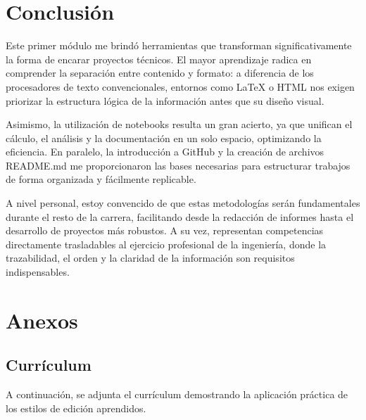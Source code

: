 \documentclass[runningheads]{llncs}
\begin{document}
\section{Conclusión}

Este primer módulo me brindó herramientas que transforman significativamente la forma de encarar proyectos técnicos. El mayor aprendizaje radica en comprender la separación entre contenido y formato: a diferencia de los procesadores de texto convencionales, entornos como LaTeX o HTML nos exigen priorizar la estructura lógica de la información antes que su diseño visual.

Asimismo, la utilización de notebooks resulta un gran acierto, ya que unifican el cálculo, el análisis y la documentación en un solo espacio, optimizando la eficiencia. En paralelo, la introducción a GitHub y la creación de archivos README.md me proporcionaron las bases necesarias para estructurar trabajos de forma organizada y fácilmente replicable.

A nivel personal, estoy convencido de que estas metodologías serán fundamentales durante el resto de la carrera, facilitando desde la redacción de informes hasta el desarrollo de proyectos más robustos. A su vez, representan competencias directamente trasladables al ejercicio profesional de la ingeniería, donde la trazabilidad, el orden y la claridad de la información son requisitos indispensables.

\section{Anexos}

\subsection{Currículum}
A continuación, se adjunta el currículum demostrando la aplicación práctica de los estilos de edición aprendidos.





\end{document}

